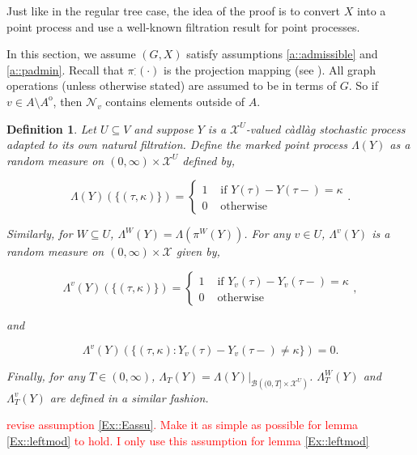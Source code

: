 \documentclass[12pt]{article}
\newcommand{\mc}{\mathcal}
\newcommand{\ms}{\mathscr}
\newcommand{\te}{\text}
\newcommand{\tr}{\textcolor{red}}
\newcommand{\ind}{\hspace{24pt}}
\newcommand{\sta}{\mc{X}}							%
\newcommand{\neigh}[1]{\mc{N}_{#1}}				%
\newcommand{\Xf}{X}									%
\newcommand{\proj}{\pi}								%
\newcommand{\vind}[1]{_{#1}}						%
\newcommand{\tme}[1]{(#1)}							%
\newcommand{\vpara}[1]{^{#1}}						%
\newcommand{\tpara}[1]{_{#1}}						%
\newcommand{\Xg}{Y}									%
\newcommand{\inte}[1]{{#1}^\mathrm{o}}				%
\newcommand{\pmap}{\Lambda}							%
\newcommand{\rt}{\tau}								%
\renewcommand{\mark}{\kappa}						%
\newtheorem{defn}[thms]{Definition}
\begin{document}
\ind Just like in the regular tree case, the idea of the proof is to convert \(\Xf\) into a point process and use a well-known filtration result for point processes.

\ind In this section, we assume \((G,\Xf)\) satisfy assumptions \ref{a::admissible} and \ref{a::padmin}. Recall that \(\proj\vpara{\cdot}\tpara{\cdot}(\cdot)\) is the projection mapping (see \cite[section \ref{F-not::p}]{F}). All graph operations (unless otherwise stated) are assumed to be in terms of \(G\). So if \(v \in A\setminus\inte{A}\), then \(\neigh{v}\) contains elements outside of \(A\).

\begin{defn}
Let \(U\subseteq V\) and suppose \(\Xg\) is a \(\sta^U\)-valued c\`adl\`ag stochastic process adapted to its own natural filtration. Define the marked point process \(\pmap(\Xg)\) as a random measure on \((0,\infty) \times \sta^U\) defined by,

\[\pmap(\Xg)(\{(\rt,\mark)\}) = \begin{cases}
1 &\te{ if } \Xg\tme{\rt} - \Xg\tme{\rt-} = \mark\\
0 &\te{ otherwise}
\end{cases}.\]

Similarly, for \(W \subseteq U\), \(\pmap\vpara{W}(\Xg) = \pmap\left(\proj\vpara{W}(\Xg)\right)\). For any \(v\in U\), \(\pmap\vpara{v}(\Xg)\) is a random measure on \((0,\infty) \times \sta\) given by,

\[\pmap\vpara{v}(\Xg)(\{(\rt,\mark)\}) = \begin{cases}
1 &\te{ if } \Xg\vind{v}\tme{\rt} - \Xg\vind{v}\tme{\rt-} = \mark\\
0 &\te{ otherwise}
\end{cases},\]

and

\[\pmap\vpara{v}(\Xg)(\{(\rt,\mark): \Xg\vind{v}\tme{\rt} - \Xg\vind{v}\tme{\rt-} \neq \mark\}) = 0.\]

Finally, for any \(T\in (0,\infty)\), \(\pmap\tpara{T}(\Xg) = \pmap(\Xg)|_{\ms{B}\left((0,T]\times\sta^U\right)}\). \(\pmap\vpara{W}\tpara{T}(\Xg)\) and \(\pmap\vpara{v}\tpara{T}(\Xg)\) are defined in a similar fashion.
\label{Ex::pmap}
\end{defn}

\ind \tr{revise assumption \ref{Ex::Eassu}. Make it as simple as possible for lemma \ref{Ex::leftmod} to hold. I only use this assumption for lemma \ref{Ex::leftmod}}
\end{document}
